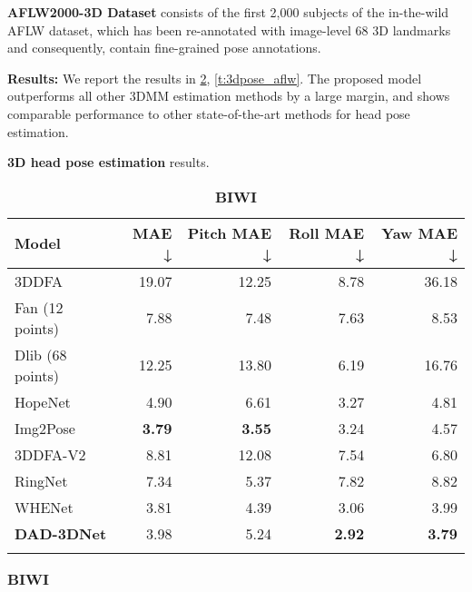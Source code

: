 \documentclass[10pt,twocolumn,letterpaper]{article}
\begin{document}
\textbf{AFLW2000-3D Dataset}  \cite{AFLW2000-3D} consists of the first 2,000 subjects of the in-the-wild AFLW dataset, which has been re-annotated with image-level 68 3D landmarks
and consequently, contain fine-grained pose annotations. 

\textbf{Results:} We report the results in \cref{t:3dpose_biwi}, \cref{t:3dpose_aflw}.
The proposed model outperforms all other 3DMM estimation methods by a large margin, and shows comparable performance to other state-of-the-art methods for head pose estimation. 

\begin{table}[t]
\footnotesize
\caption{\textbf{3D head pose estimation} results.}
\setlength{\tabcolsep}{3pt}
	\begin{subtable}[t]{.99\linewidth}\centering
		{\scriptsize
\begin{adjustbox}{width=0.99\textwidth}
\begin{tabular}{@{}lrrrr@{}}
\noalign{\smallskip}
\toprule \textbf{Model} & \textbf{MAE} ↓ & \textbf{Pitch MAE} ↓ & \textbf{Roll MAE} ↓ & \textbf{Yaw MAE} ↓ \\\toprule 3DDFA \cite{3ddfa_cleardusk, zhu2017face} \ & 19.07 & 12.25 & 8.78 & 36.18\\
Fan (12 points)\cite{FacePoseNet} & 7.88 & 7.48 & 7.63 & 8.53\\
Dlib (68 points)\cite{dlib09} & 12.25 & 13.80 & 6.19 & 16.76\\
HopeNet\cite{HOPE-Net} & 4.90 & 6.61 & 3.27 & 4.81\\
Img2Pose\cite{img2pose} & \textbf{3.79} & \textbf{3.55} & 3.24 & 4.57\\
3DDFA-V2\cite{3ddfa_cleardusk, guo2020towards} & 8.81 & 12.08 & 7.54 & 6.80 \\
RingNet\cite{RingNet} & 7.34 & 5.37 & 7.82 & 8.82 \\
WHENet\cite{WHENet} & 3.81 & 4.39 & 3.06 & 3.99 \\
\textbf{DAD-3DNet} & 3.98 & 5.24 & \textbf{2.92} & \textbf{3.79}\\\bottomrule \noalign{\smallskip}
\end{tabular}
\end{adjustbox}
\caption{\textbf{BIWI}\cite{BIWI}}
\label{t:3dpose_biwi} }	
	\end{subtable}
	\hfill
	\begin{subtable}[t]{.99\linewidth}\centering
		{\begin{adjustbox}{width=0.99\textwidth}
\begin{tabular}{@{}lrrrr@{}}

\end{tabular}
\end{adjustbox}}
\end{subtable}
\end{table}
\end{document}
